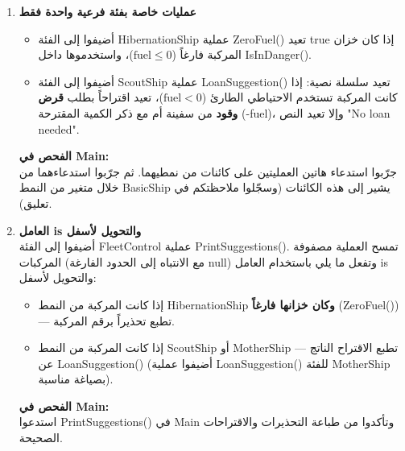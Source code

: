 \documentclass[14pt]{extarticle}
\begin{document}
\begin{enumerate}[resume, label=\textbf{تمرين \arabic*:}, wide=0pt, leftmargin=*, itemsep=2.2em]

    \item \textbf{عمليات خاصة بفئة فرعية واحدة فقط}
    \begin{itemize}
        \item أضيفوا إلى الفئة \textenglish{HibernationShip} عملية \textenglish{ZeroFuel()} تعيد \textenglish{true} إذا كان خزان المركبة فارغاً ($\text{fuel} \le 0$)، واستخدموها داخل \textenglish{IsInDanger()}.
        \item أضيفوا إلى الفئة \textenglish{ScoutShip} عملية \textenglish{LoanSuggestion()} تعيد سلسلة نصية: إذا كانت المركبة تستخدم الاحتياطي الطارئ ($\text{fuel} < 0$)، تعيد اقتراحاً بطلب \textbf{قرض وقود} من سفينة أم مع ذكر الكمية المقترحة (\textenglish{-fuel})، وإلا تعيد النص \textenglish{"No loan needed"}.
    \end{itemize}
    \textbf{الفحص في \textenglish{Main}:} \\
    جرّبوا استدعاء هاتين العمليتين على كائنات من نمطيهما. ثم جرّبوا استدعاءهما من خلال متغير من النمط \textenglish{BasicShip} يشير إلى هذه الكائنات (وسجّلوا ملاحظتكم في تعليق).

    \item \textbf{العامل \textenglish{is} والتحويل لأسفل} \\
    أضيفوا إلى الفئة \textenglish{FleetControl} عملية \textenglish{PrintSuggestions()}. تمسح العملية مصفوفة المركبات (مع الانتباه إلى الحدود الفارغة \textenglish{null}) وتفعل ما يلي باستخدام العامل \textenglish{is} والتحويل لأسفل:
    \begin{itemize}
        \item إذا كانت المركبة من النمط \textenglish{HibernationShip} \textbf{وكان خزانها فارغاً} (\textenglish{ZeroFuel()}) — تطبع تحذيراً برقم المركبة.
        \item إذا كانت المركبة من النمط \textenglish{ScoutShip} أو \textenglish{MotherShip} — تطبع الاقتراح الناتج عن \textenglish{LoanSuggestion()} (أضيفوا عملية \textenglish{LoanSuggestion()} للفئة \textenglish{MotherShip} بصياغة مناسبة).
    \end{itemize}
    \textbf{الفحص في \textenglish{Main}:} \\
    استدعوا \textenglish{PrintSuggestions()} في \textenglish{Main} وتأكدوا من طباعة التحذيرات والاقتراحات الصحيحة.


\end{enumerate}
\end{document}
